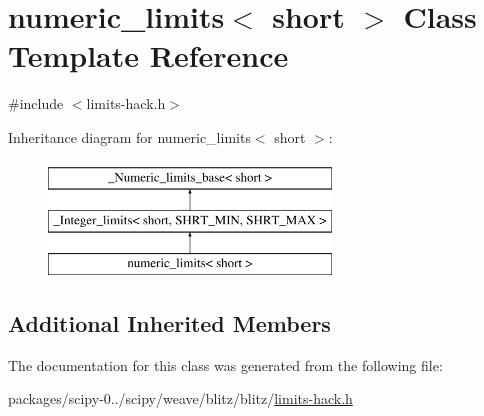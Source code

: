\hypertarget{classnumeric__limits_3_01short_01_4}{}\section{numeric\+\_\+limits$<$ short $>$ Class Template Reference}
\label{classnumeric__limits_3_01short_01_4}


{\ttfamily \#include $<$limits-\/hack.\+h$>$}

Inheritance diagram for numeric\+\_\+limits$<$ short $>$\+:\begin{figure}[H]
\begin{center}
\leavevmode
\includegraphics[height=3.000000cm]{classnumeric__limits_3_01short_01_4}
\end{center}
\end{figure}
\subsection*{Additional Inherited Members}


The documentation for this class was generated from the following file\+:\begin{DoxyCompactItemize}
\item 
packages/scipy-\/0../scipy/weave/blitz/blitz/\hyperlink{limits-hack_8h}{limits-\/hack.\+h}\end{DoxyCompactItemize}
